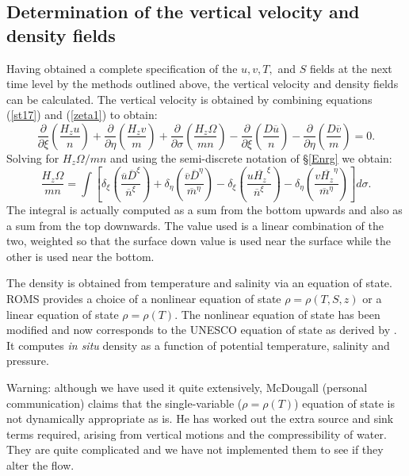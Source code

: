 \subsection{Determination of the vertical velocity and density fields}
\label{EOS}
Having obtained a complete specification of the $u,v,T,$ and $S$ fields
at the next time level by the methods outlined above, the vertical
velocity and density fields can be calculated.  The vertical velocity
is obtained by combining equations (\ref{st17}) and (\ref{zeta1}) to
obtain:
\begin{equation}
   \frac{\partial}{\partial \xi} \left( \frac{H_z u}{n} \right) +
   \frac{\partial}{\partial \eta} \left( \frac{H_z v}{m} \right) +
   \frac{\partial}{\partial \sigma}\left( \frac{H_z \Omega}{mn} \right)
   - \frac{\partial}{\partial \xi} \left( \frac{D \overline{u}}{n}
   \right) -
   \frac{\partial}{\partial \eta} \left( \frac{D \overline{v}}{m}
   \right)  = 0 .
\label{zeta2}
\end{equation}
Solving for $H_z \Omega / mn$ and using the semi-discrete notation of
\S\ref{Enrg} we obtain:
\begin{equation}
   \frac{H_z \Omega}{mn} =  \int  \left[
   \delta_{\xi} \left( \frac{\overline{u} \overline{D}^{\xi}}
   {\overline{n}^{\xi}} \right) +
   \delta_{\eta} \left( \frac{\overline{v} \overline{D}^{\eta}}
   {\overline{m}^{\eta}} \right) -
   \delta_{\xi} \left( \frac{u \overline{H_z}^{\xi}}
   {\overline{n}^{\xi}} \right) - 
   \delta_{\eta} \left( \frac{v \overline{H_z}^{\eta}}
   {\overline{m}^{\eta}} \right)  \right] d\sigma .
\label{omega}
\end{equation}
The integral is actually computed as a sum from the bottom upwards and
also as a sum from the top downwards.  The value used is a linear
combination of the two, weighted so that the surface down value is used
near the surface while the other is used near the bottom.

The density is obtained from temperature and salinity via an
equation of state.  ROMS provides a choice of a nonlinear equation
of state $\rho = \rho(T,S,z)$ or a linear equation of state $\rho =
\rho(T)$.  The nonlinear equation of state has been modified and now
corresponds to the UNESCO equation of state as derived by
\citet{Jackett}.  It computes {\sl in situ} density as a
function of potential temperature, salinity and pressure.

Warning: although we have used it quite extensively, McDougall
(personal communication) claims that the single-variable ($\rho =
\rho(T)$) equation of state is not dynamically appropriate as is.
He has worked out the extra source and sink terms required, arising
from vertical motions and the compressibility of water.  They are
quite complicated and we have not implemented them to see if they
alter the flow.

